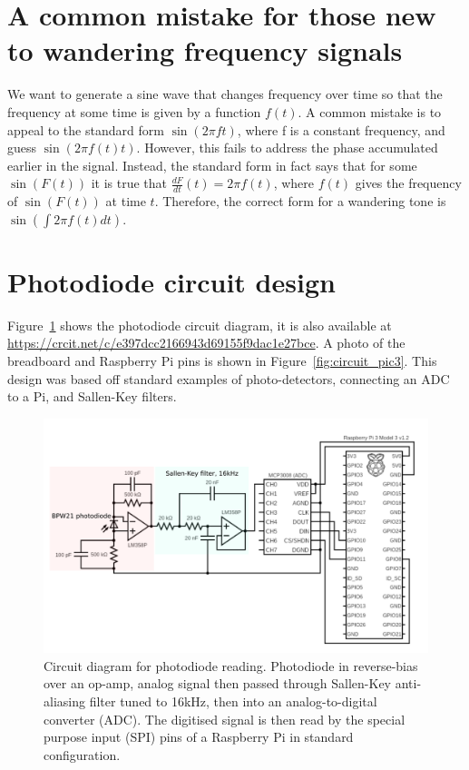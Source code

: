 \documentclass[paper-main.tex]{subfiles}
\begin{document}
\section{A common mistake for those new to wandering frequency signals}
\label{app:phase_gotcha}

We want to generate a sine wave that changes frequency over time so that the frequency at some time is given by a function $f(t)$. A common mistake is to appeal to the standard form $\sin{(2 \pi f t)}$, where f is a constant frequency, and guess $\sin{(2 \pi f(t) t)}$. However, this fails to address the phase accumulated earlier in the signal. Instead, the standard form in fact says that for some $\sin{(F(t))}$ it is true that $\frac{dF}{dt}(t) = 2 \pi f(t)$, where $f(t)$ gives the frequency of $\sin{(F(t))}$ at time $t$. Therefore, the correct form for a wandering tone is $\sin{(\int{2 \pi f(t) dt})}$.


\section{Photodiode circuit design}
\label{app:circuit_diagram}

Figure~\ref{fig:circuit_diagram} shows the photodiode circuit diagram, it is also available at \url{https://crcit.net/c/e397dcc2166943d69155f9dac1e27bce}. A photo of the breadboard and Raspberry Pi pins is shown in Figure~\ref{fig:circuit_pic3}. This design was based off standard examples of photo-detectors, connecting an ADC to a Pi, and Sallen-Key filters.

\begin{figure}
	\includegraphics[width=.65\textwidth]{figures/circuit_diagram_2.pdf}
	\caption{Circuit diagram for photodiode reading. Photodiode in reverse-bias over an op-amp, analog signal then passed through Sallen-Key anti-aliasing filter tuned to 16kHz, then into an analog-to-digital converter (ADC). The digitised signal is then read by the special purpose input (SPI) pins of a Raspberry Pi in standard configuration.}
	\label{fig:circuit_diagram}
\end{figure}
\end{document}
